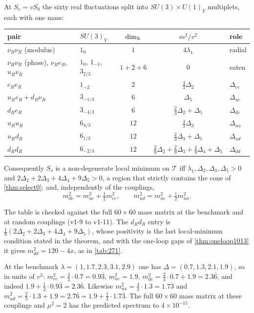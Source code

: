 \begin{theorem}
\label{thm:secondvar}
At $S_v=vS_0$ the sixty real fluctuations split into $SU(3)\times U(1)_Y$ multiplets, each with one mass:
\begin{center}
\small
\begin{tabular}{@{}llccl@{}}
\toprule
pair & $SU(3)_Y$ & $\dim_{\mathbb{R}}$ & $m^2/v^2$ & role\\
\midrule
$\nu_R\nu_R$ (modulus) & $1_0$ & $1$ & $4\lambda_1$ & radial\\
$\nu_R\nu_R$ (phase), $\nu_Re_R$, $u_R\nu_R$ & $1_0$, $1_{-1}$, $3_{2/3}$ & $1+2+6$ & $0$ & eaten\\
$e_Re_R$ & $1_{-2}$ & $2$ & $\tfrac43\Delta_2$ & $\Delta_{ee}$\\
$u_Re_R+d_R\nu_R$ & $3_{-1/3}$ & $6$ & $\Delta_5$ & $\Delta_{ue}$\\
$d_Re_R$ & $3_{-4/3}$ & $6$ & $\tfrac23\Delta_2+\Delta_5$ & $\Delta_{de}$\\
$u_Ru_R$ & $6_{4/3}$ & $12$ & $\tfrac43\Delta_3$ & $\Delta_{uu}$\\
$u_Rd_R$ & $6_{1/3}$ & $12$ & $\tfrac23\Delta_3+\Delta_5$ & $\Delta_{ud}$\\
$d_Rd_R$ & $6_{-2/3}$ & $12$ & $\tfrac29\Delta_2+\tfrac29\Delta_3+\tfrac49\Delta_4+\Delta_5$ & $\Delta_{dd}$\\
\bottomrule
\end{tabular}
\end{center}
Consequently $S_v$ is a non-degenerate local minimum on $\mathcal T$ iff $\lambda_1,\Delta_2,\Delta_3,\Delta_5>0$ and $2\Delta_2+2\Delta_3+4\Delta_4+9\Delta_5>0$, a region that
strictly contains the cone of \cref{thm:select0}; and, independently of the couplings,
\begin{equation}
\label{eq:sumrules}
m_{de}^2=m_{ue}^2+\tfrac12m_{ee}^2,\qquad m_{ud}^2=m_{ue}^2+\tfrac12m_{uu}^2 .
\end{equation}
\end{theorem}

The table is checked against the full $60\times60$ mass matrix at the benchmark and at random couplings (v1-9 to v1-11). The $d_Rd_R$ entry is
$\tfrac19(2\Delta_2+2\Delta_3+4\Delta_4+9\Delta_5)$, whose positivity is the last local-minimum condition stated in the theorem, and with the one-loop gaps of
\cref{thm:oneloop1013} it gives $m_{dd}^2=120-4x$, as in \cref{tab:271}.

\begin{example}
\label{ex:sumrule}
At the benchmark $\lambda=(1,1.7,2.3,3.1,2.9)$ one has $\Delta=(0.7,1.3,2.1,1.9)$, so in units of $v^2$: $m_{ee}^2=\tfrac43\cdot0.7=0.9\overline3$,
$m_{ue}^2=1.9$, $m_{de}^2=\tfrac23\cdot0.7+1.9=2.3\overline6$, and indeed $1.9+\tfrac12\cdot0.9\overline3=2.3\overline6$. Likewise $m_{uu}^2=\tfrac43\cdot1.3=1.7\overline3$
and $m_{ud}^2=\tfrac23\cdot1.3+1.9=2.7\overline6=1.9+\tfrac12\cdot1.7\overline3$. The full $60\times60$ mass matrix at these couplings and $\mu^2=2$ has the
predicted spectrum to $4\times10^{-15}$.
\end{example}

